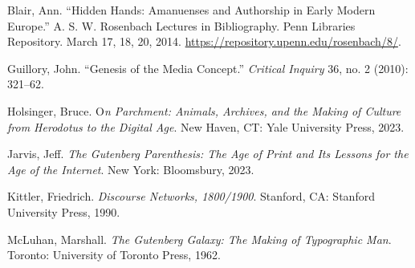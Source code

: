 \documentclass{tufte-handout}
\begin{document}
\begin{hangparas}{.25in}{1} 



Blair, Ann. ``Hidden Hands: Amanuenses and Authorship in Early Modern
Europe.'' A. S. W. Rosenbach Lectures in Bibliography. Penn Libraries
Repository. March 17, 18, 20, 2014.
\url{https://repository.upenn.edu/rosenbach/8/}.

Guillory, John. ``Genesis of the Media Concept.'' \emph{Critical
Inquiry} 36, no. 2 (2010): 321--62.

Holsinger, Bruce. O\emph{n Parchment: Animals, Archives, and the Making
of Culture from Herodotus to the Digital Age}. New Haven, CT: Yale
University Press, 2023.

Jarvis, Jeff. \emph{The Gutenberg Parenthesis: The Age of Print and Its
Lessons for the Age of the Internet}. New York: Bloomsbury, 2023.

Kittler, Friedrich. \emph{Discourse Networks, 1800/1900}. Stanford, CA:
Stanford University Press, 1990.

McLuhan, Marshall. \emph{The Gutenberg Galaxy: The Making of Typographic
Man}. Toronto: University of Toronto Press, 1962.



\end{hangparas}
\end{document}
